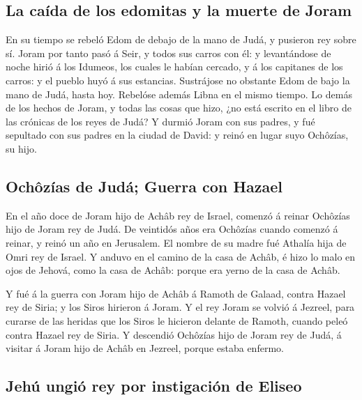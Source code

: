 \hypertarget{la-cauxedda-de-los-edomitas-y-la-muerte-de-joram}{%
\subsection{La caída de los edomitas y la muerte de
Joram}\label{la-cauxedda-de-los-edomitas-y-la-muerte-de-joram}}

 En su tiempo se rebeló Edom de debajo de la mano de Judá,
y pusieron rey sobre sí.  Joram por tanto pasó á Seir, y
todos sus carros con él: y levantándose de noche hirió á los Idumeos,
los cuales le habían cercado, y á los capitanes de los carros: y el
pueblo huyó á sus estancias.  Sustrájose no obstante Edom
de bajo la mano de Judá, hasta hoy. Rebelóse además Libna en el mismo
tiempo.  Lo demás de los hechos de Joram, y todas las cosas
que hizo, ¿no está escrito en el libro de las crónicas de los reyes de
Judá?  Y durmió Joram con sus padres, y fué sepultado con
sus padres en la ciudad de David: y reinó en lugar suyo Ochôzías, su
hijo.

\hypertarget{ochuxf4zuxedas-de-juduxe1-guerra-con-hazael}{%
\subsection{Ochôzías de Judá; Guerra con
Hazael}\label{ochuxf4zuxedas-de-juduxe1-guerra-con-hazael}}

 En el año doce de Joram hijo de Achâb rey de Israel,
comenzó á reinar Ochôzías hijo de Joram rey de Judá.  De
veintidós años era Ochôzías cuando comenzó á reinar, y reinó un año en
Jerusalem. El nombre de su madre fué Athalía hija de Omri rey de Israel.
 Y anduvo en el camino de la casa de Achâb, é hizo lo malo
en ojos de Jehová, como la casa de Achâb: porque era yerno de la casa de
Achâb.

 Y fué á la guerra con Joram hijo de Achâb á Ramoth de
Galaad, contra Hazael rey de Siria; y los Siros hirieron á Joram.
 Y el rey Joram se volvió á Jezreel, para curarse de las
heridas que los Siros le hicieron delante de Ramoth, cuando peleó contra
Hazael rey de Siria. Y descendió Ochôzías hijo de Joram rey de Judá, á
visitar á Joram hijo de Achâb en Jezreel, porque estaba enfermo.

\hypertarget{jehuxfa-ungiuxf3-rey-por-instigaciuxf3n-de-eliseo}{%
\subsection{Jehú ungió rey por instigación de
Eliseo}\label{jehuxfa-ungiuxf3-rey-por-instigaciuxf3n-de-eliseo}}

